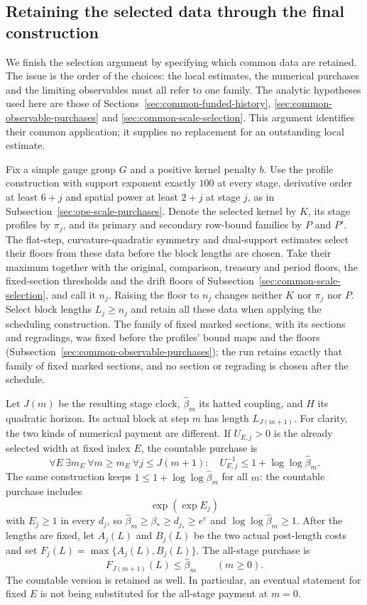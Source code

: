 \subsection{Retaining the selected data through the final construction}
\label{sec:public-run-binding}

We finish the selection argument by specifying which common data are
retained. The issue is the order of the choices: the local estimates,
the numerical purchases and the limiting observables must all refer to
one family. The analytic hypotheses used here are those of
Sections~\ref{sec:common-funded-history},
\ref{sec:common-observable-purchases} and
\ref{sec:common-scale-selection}. This argument identifies their common
application; it supplies no replacement for an outstanding local estimate.

Fix a simple gauge group $G$ and a positive kernel penalty $b$.
Use the profile construction with support exponent exactly $100$ at
every stage, derivative order at least $6+j$ and spatial power at least
$2+j$ at stage $j$, as in Subsection~\ref{sec:ope-scale-purchases}. Denote the selected kernel by $K$, its stage profiles
by $\pi_j$, and its primary and secondary row-bound families by $P$ and
$P'$. The flat-step, curvature-quadratic symmetry and dual-support estimates select their
floors from these data before the block lengths are chosen. Take their
maximum together with the original, comparison, treasury and period
floors, the fixed-section thresholds and the drift floors of
Subsection~\ref{sec:common-scale-selection}, and call it $n_j$. Raising the
floor to $n_j$ changes neither $K$ nor $\pi_j$ nor $P$. Select block
lengths $L_j\ge n_j$ and retain all these data when applying the
scheduling construction. The family of fixed marked sections, with its sections and
regradings, was fixed before the profiles' bound maps and the floors
(Subsection~\ref{sec:common-observable-purchases}); the run retains exactly
that family of fixed marked sections, and no section or regrading is chosen after the
schedule.

Let $J(m)$ be the resulting stage clock, $\widehat\beta_m$ its hatted
coupling, and $H$ its quadratic horizon. Its actual block at step $m$
has length $L_{J(m+1)}$. For clarity, the two kinds of numerical payment
are different. If $U_{E,j}>0$ is the already selected width at fixed
index $E$, the countable purchase is
\[
 \forall E\ \exists m_E\ \forall m\ge m_E\ \forall j\le J(m+1):
 \quad U_{E,j}^{-1}\le 1+\log\log\widehat\beta_m.
\]
The same construction keeps $1\le1+\log\log\widehat\beta_m$ for
all $m$: the countable purchase includes \[
 \exp(\exp E_j)
\]
with
$E_j\ge1$ in every $d_j$, so
$\widehat\beta_m\ge\beta_*\ge d_{j_*}\ge e^e$ and
$\log\log\widehat\beta_m\ge1$. After the lengths are fixed, let $A_j(L)$ and $B_j(L)$
be the two actual post-length costs and set
$F_j(L)=\max\{A_j(L),B_j(L)\}$. The all-stage purchase is
\begin{equation}\label{eq:public-native-allstage}
       F_{J(m+1)}(L)\le\widehat\beta_m\qquad(m\ge0).
\end{equation}
The countable version is retained as well. In particular, an eventual
statement for fixed $E$ is not being substituted for the all-stage
payment at $m=0$.

